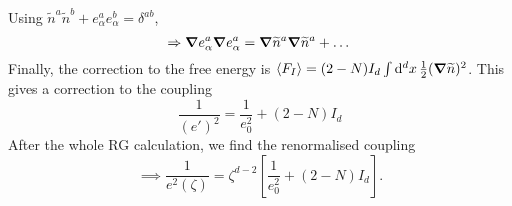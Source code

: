 Using $\widetilde{n}^{a} \widetilde{n}^{b} + e^{a}_{\alpha} e^{b}_{\alpha} = \delta^{ab}$,
\begin{equation}
  \Rightarrow \grad e^{a}_{\alpha} \grad e^{a}_{\alpha} = \grad \widetilde{n}^{a} \grad \widetilde{n}^{a} + \dots
\end{equation}
Finally, the correction to the free energy is $\langle F_I \rangle = (2 -N) I_d \int \dd[d]{x} \frac{1}{2} (\grad \widetilde{n})^2$. This gives a correction to the coupling
\begin{equation}
  \frac{1}{(e')^2} = \frac{1}{e_0^2} + (2-N) I_d
\end{equation}
After the whole RG calculation, we find the renormalised coupling
\begin{equation}
  \implies \frac{1}{e^2(\zeta)} = \zeta^{d-2} \left[ \frac{1}{e_0^2} + (2-N) I_d \right].
\end{equation}
